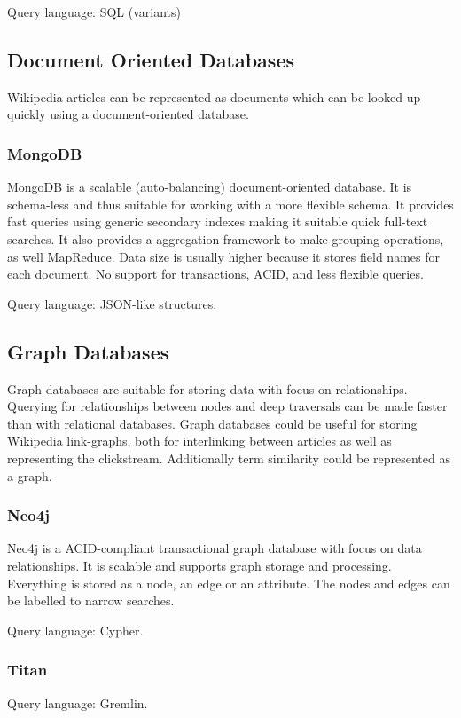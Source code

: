 Query language: SQL (variants)

\subsection{Document Oriented Databases}
Wikipedia articles can be represented as documents which can be looked up quickly using a document-oriented database. 

\subsubsection{MongoDB}
MongoDB is a scalable (auto-balancing) document-oriented database. It is schema-less and thus suitable for working with a more flexible schema.
It provides fast queries using generic secondary indexes making it suitable quick full-text searches. It also provides a aggregation framework to make grouping operations, as well MapReduce.
Data size is usually higher because it stores field names for each document. No support for transactions, ACID, and less flexible queries. 

Query language: JSON-like structures.

\subsection{Graph Databases}
Graph databases are suitable for storing data with focus on relationships. Querying for relationships between nodes and deep traversals can be made faster than with relational databases.
Graph databases could be useful for storing Wikipedia link-graphs, both for interlinking between articles as well as representing the clickstream. Additionally term similarity could be represented as a graph.

\subsubsection{Neo4j}
Neo4j is a ACID-compliant transactional graph database with focus on data relationships. It is scalable and supports graph storage and processing. Everything is stored as a node, an edge or an attribute. The nodes and edges can be labelled to narrow searches.

Query language: Cypher.

\subsubsection{Titan}
Query language: Gremlin.

